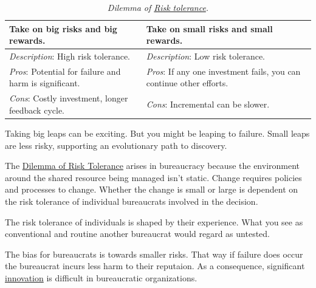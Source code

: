 \begin{center}
\begin{table}[H] %
\begin{tabular}{ | m{\dilemmatablewidth}| m{\dilemmatablewidth} | } 
  \hline
  \textbf{Take on big risks and big rewards.} & 
  \textbf{Take on small risks and small rewards.} \\ 
  \hline
  \textit{Description}: High risk tolerance. &
  \textit{Description}: Low risk tolerance. \\
  \hline
  \textit{Pros}: Potential for failure and harm is significant. &
  \textit{Pros}: If any one investment fails, you can continue other efforts. \\
  \hline
  \textit{Cons}: Costly investment, longer feedback cycle. & 
  \textit{Cons}: Incremental can be slower. \\
  \hline
\end{tabular}
\caption{
\textit{Dilemma of \href{https://en.wikipedia.org/wiki/Risk_assessment}{Risk tolerance}.
} 
}
\label{table:risk}
\end{table}
\end{center}

Taking big leaps can be exciting. But you might be leaping to failure. Small leaps are less risky, supporting an evolutionary path to discovery. 

The \hyperref[table:risk]{Dilemma of Risk Tolerance} arises in bureaucracy because the environment around the shared resource being managed isn't static. Change requires policies and processes to change. Whether the change is small or large is dependent on the risk tolerance of individual bureaucrats involved in the decision. 

The risk tolerance of individuals is shaped by their experience. What you see as conventional and routine another bureaucrat would regard as untested. 

The bias for bureaucrats is towards smaller risks. That way if failure does occur the bureaucrat incurs less harm to their reputaion. As a consequence, significant 
\hyperref[sec:innovation]{innovation} is difficult in bureaucratic organizations. 


